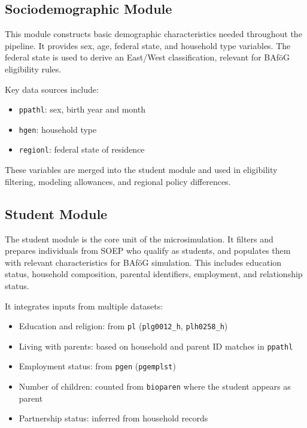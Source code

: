 \subsection{Sociodemographic Module}

This module constructs basic demographic characteristics needed throughout the pipeline. It provides sex, age, federal state, and household type variables. The federal state is used to derive an East/West classification, relevant for BAföG eligibility rules.

Key data sources include:

\begin{itemize}
  \item \texttt{ppathl}: sex, birth year and month
  \item \texttt{hgen}: household type
  \item \texttt{regionl}: federal state of residence
\end{itemize}

These variables are merged into the student module and used in eligibility filtering, modeling allowances, and regional policy differences.

\subsection{Student Module}

The student module is the core unit of the microsimulation. 
It filters and prepares individuals from SOEP who qualify as students, and populates them with relevant characteristics for BAföG simulation. 
This includes education status, household composition, parental identifiers, employment, and relationship status.

It integrates inputs from multiple datasets:

\begin{itemize}
  \item Education and religion: from \texttt{pl} (\texttt{plg0012\_h}, \texttt{plh0258\_h})
  \item Living with parents: based on household and parent ID matches in \texttt{ppathl}
  \item Employment status: from \texttt{pgen} (\texttt{pgemplst})
  \item Number of children: counted from \texttt{bioparen} where the student appears as parent
  \item Partnership status: inferred from household records
\end{itemize}


